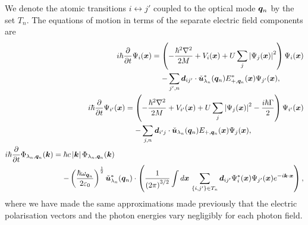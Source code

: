 We denote the atomic transitions $i \leftrightarrow j'$ coupled to the optical mode $\bm{q}_n$ by the set $T_n$. The equations of motion in terms of the separate electric field components are
\begin{subequations}
    \label{OpticalPumping:MeanFieldRWAEvolutionSeparatedOpticalFields}
    \begin{align}
        \begin{split}
            i \hbar \frac{\partial}{\partial t} \Psi_i(\vect{x}) &= \left( -\frac{\hbar^2 \nabla^2}{2M} + V_i(\vect{x}) + U \sum_j \abs{\Psi_j(\vect{x})}^2\right) \Psi_i(\vect{x})\\
            &\relphantom{=} - \sum_{j',n} \vect{d}_{ij'} \cdot \unitvec{u}^*_{\lambda_n}(\vect{q}_n) {E}_{+,\vect{q}_n}^*(\vect{x}) \Psi_{j'}(\vect{x}),
        \end{split}\\
        \begin{split}
            i \hbar \frac{\partial}{\partial t} \Psi_{i'}(\vect{x}) &= \left( -\frac{\hbar^2 \nabla^2}{2M} + V_{i'}(\vect{x}) + U \sum_j \abs{\Psi_j(\vect{x})}^2 - \frac{i\hbar \Gamma}{2}\right) \Psi_{i'}(\vect{x})\\
            &\relphantom{=} - \sum_{j,n} \vect{d}_{i'j} \cdot \unitvec{u}_{\lambda_n}(\vect{q}_n) {E}_{+,\vect{q}_n}(\vect{x}) \Psi_{j}(\vect{x}),
        \end{split}\\
        \begin{split}
            i \hbar \frac{\partial}{\partial t} \Phi_{\lambda_n, \vect{q}_n}(\vect{k}) &= \hbar c \abs{\vect{k}} \Phi_{\lambda_n,\vect{q}_n}(\vect{k}) \\
            &\relphantom{=} - \left(\frac{\hbar \omega_{\vect{q}_n}}{2 \varepsilon_0}\right)^{\frac{1}{2}} \unitvec{u}_{\lambda_n}^*(\vect{q}_n) \cdot \left( \frac{1}{\left(2\pi\right)^{3/2}} \int d \vect{x}\, \sum_{\{i,j'\}\in T_n}\vect{d}_{ij'} \Psi^*_i(\vect{x}) \Psi_{j'}(\vect{x}) e^{-i \vect{k} \cdot \vect{x}} \right), \label{OpticalPumping:MeanFieldSeparatedPhotonEvolution}
        \end{split}
    \end{align}
\end{subequations}
where we have made the same approximations made previously that the electric polarisation vectors and the photon energies vary negligibly for each photon field.

